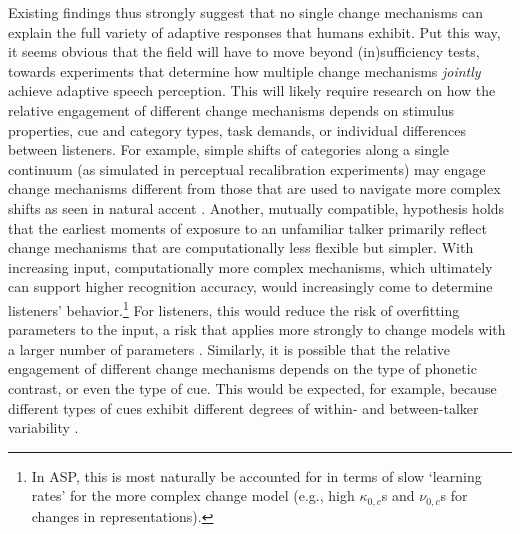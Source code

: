 \documentclass[
  11pt,
  man,floatsintext]{apa6}
\begin{document}
Existing findings thus strongly suggest that no single change mechanisms can explain the full variety of adaptive responses that humans exhibit. Put this way, it seems obvious that the field will have to move beyond (in)sufficiency tests, towards experiments that determine how multiple change mechanisms \emph{jointly} achieve adaptive speech perception. This will likely require research on how the relative engagement of different change mechanisms depends on stimulus properties, cue and category types, task demands, or individual differences between listeners. For example, simple shifts of categories along a single continuum (as simulated in perceptual recalibration experiments) may engage change mechanisms different from those that are used to navigate more complex shifts as seen in natural accent \autocites[for discussion, see][]{bent-baeseberk2021,samuel-kraljic2009,zheng-samuel2020}. Another, mutually compatible, hypothesis holds that the earliest moments of exposure to an unfamiliar talker primarily reflect change mechanisms that are computationally less flexible but simpler. With increasing input, computationally more complex mechanisms, which ultimately can support higher recognition accuracy, would increasingly come to determine listeners' behavior.\footnote{In ASP, this is most naturally be accounted for in terms of slow `learning rates' for the more complex change model (e.g., high \(\kappa_{0,c}\)s and \(\nu_{0,c}\)s for changes in representations).} For listeners, this would reduce the risk of overfitting parameters to the input, a risk that applies more strongly to change models with a larger number of parameters \autocites[for discussion, see][]{apfelbaum-mcmurray2015,kleinschmidt-jaeger2015,toscano-mcmurray2010}. Similarly, it is possible that the relative engagement of different change mechanisms depends on the type of phonetic contrast, or even the type of cue. This would be expected, for example, because different types of cues exhibit different degrees of within- and between-talker variability \autocites[see discussions in][p.~179-180]{kleinschmidt-jaeger2015}{kraljic-samuel2007,xie2021cognition}.
\end{document}
